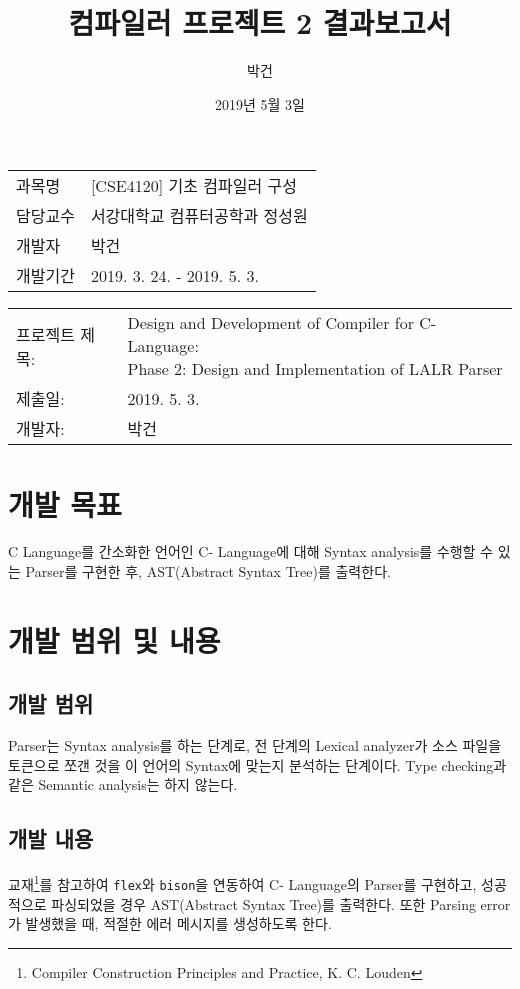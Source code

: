 \documentclass[a4paper, 10pt]{oblivoir}
\title{컴파일러 프로젝트 2 결과보고서}
\author{박건}
\date{2019년 5월 3일}
\begin{document}
\maketitle

\vspace*{\fill}

\begin{center}
\begin{tabular}{ l l }
과목명 & [CSE4120] 기초 컴파일러 구성 \\
담당교수 & 서강대학교 컴퓨터공학과 정성원 \\
개발자 & 박건 \\
개발기간 & 2019. 3. 24. - 2019. 5. 3. \\
\end{tabular}
\end{center}

\vspace*{\fill}

\pagebreak

\begin{tabular}{ l l }
프로젝트 제목: & \makecell{Design and Development of Compiler for C- Language: \\
Phase 2: Design and Implementation of LALR Parser} \\
제출일: & 2019. 5. 3.\\
개발자: & 박건 \\
\end{tabular}

\section{개발 목표}
C Language를 간소화한 언어인 C- Language에 대해 Syntax analysis를 수행할 수 있는 Parser를 구현한 후, AST(Abstract Syntax Tree)를 출력한다.

\section{개발 범위 및 내용}
\subsection{개발 범위}
Parser는 Syntax analysis를 하는 단계로, 전 단계의 Lexical analyzer가 소스 파일을 토큰으로 쪼갠 것을 이 언어의 Syntax에 맞는지 분석하는 단계이다. Type checking과 같은 Semantic analysis는 하지 않는다.

\subsection{개발 내용}
교재\footnote{Compiler Construction Principles and Practice, K. C. Louden}를 참고하여 \texttt{flex}와 \texttt{bison}을 연동하여 C- Language의 Parser를 구현하고, 성공적으로 파싱되었을 경우 AST(Abstract Syntax Tree)를 출력한다. 또한 Parsing error가 발생했을 때, 적절한 에러 메시지를 생성하도록 한다.
\end{document}
